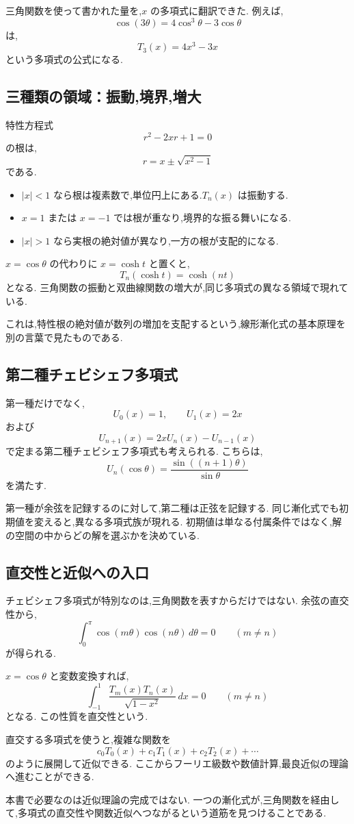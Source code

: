 三角関数を使って書かれた量を,$x$ の多項式に翻訳できた.
例えば,
\[
  \cos(3\theta)=4\cos^3\theta-3\cos\theta
\]
は,
\[
  T_3(x)=4x^3-3x
\]
という多項式の公式になる.

\subsection{三種類の領域：振動,境界,増大}

特性方程式
\[
  r^2-2xr+1=0
\]
の根は,
\[
  r=x\pm\sqrt{x^2-1}
\]
である.

\begin{itemize}
  \item $|x|<1$ なら根は複素数で,単位円上にある.$T_n(x)$ は振動する.
  \item $x=1$ または $x=-1$ では根が重なり,境界的な振る舞いになる.
  \item $|x|>1$ なら実根の絶対値が異なり,一方の根が支配的になる.
\end{itemize}

$x=\cos\theta$ の代わりに $x=\cosh t$ と置くと,
\[
  T_n(\cosh t)=\cosh(nt)
\]
となる.
三角関数の振動と双曲線関数の増大が,同じ多項式の異なる領域で現れている.

これは,特性根の絶対値が数列の増加を支配するという,線形漸化式の基本原理を別の言葉で見たものである.

\subsection{第二種チェビシェフ多項式}

第一種だけでなく,\[
  U_0(x)=1,\qquad U_1(x)=2x
\]
および
\[
  U_{n+1}(x)=2xU_n(x)-U_{n-1}(x)
\]
で定まる第二種チェビシェフ多項式も考えられる.
こちらは,
\[
  U_n(\cos\theta)
  =\frac{\sin((n+1)\theta)}{\sin\theta}
\]
を満たす.

第一種が余弦を記録するのに対して,第二種は正弦を記録する.
同じ漸化式でも初期値を変えると,異なる多項式族が現れる.
初期値は単なる付属条件ではなく,解の空間の中からどの解を選ぶかを決めている.

\subsection{直交性と近似への入口}

チェビシェフ多項式が特別なのは,三角関数を表すからだけではない.
余弦の直交性から,
\[
  \int_0^\pi\cos(m\theta)\cos(n\theta)\,d\theta=0
  \qquad(m\neq n)
\]
が得られる.

$x=\cos\theta$ と変数変換すれば,
\[
  \int_{-1}^{1}
  \frac{T_m(x)T_n(x)}{\sqrt{1-x^2}}\,dx=0
  \qquad(m\neq n)
\]
となる.
この性質を直交性という.

直交する多項式を使うと,複雑な関数を
\[
  c_0T_0(x)+c_1T_1(x)+c_2T_2(x)+\cdots
\]
のように展開して近似できる.
ここからフーリエ級数や数値計算,最良近似の理論へ進むことができる.

本書で必要なのは近似理論の完成ではない.
一つの漸化式が,三角関数を経由して,多項式の直交性や関数近似へつながるという道筋を見つけることである.

\clearpage
